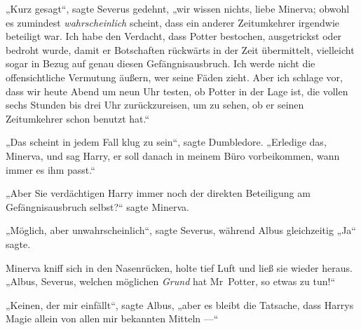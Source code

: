 „Kurz gesagt“, sagte Severus gedehnt, „wir wissen nichts, liebe Minerva; obwohl es zumindest \emph{wahrscheinlich} scheint, dass ein anderer Zeitumkehrer irgendwie beteiligt war. Ich habe den Verdacht, dass Potter bestochen, ausgetrickst oder bedroht wurde, damit er Botschaften rückwärts in der Zeit übermittelt, vielleicht sogar in Bezug auf genau diesen Gefängnisausbruch. Ich werde nicht die offensichtliche Vermutung äußern, wer seine Fäden zieht. Aber ich schlage vor, dass wir heute Abend um neun Uhr testen, ob Potter in der Lage ist, die vollen sechs Stunden bis drei Uhr zurückzureisen, um zu sehen, ob er seinen Zeitumkehrer schon benutzt hat.“

„Das scheint in jedem Fall klug zu sein“, sagte Dumbledore.
„Erledige das, Minerva, und sag Harry, er soll danach in meinem Büro vorbeikommen, wann immer es ihm passt.“

„Aber Sie verdächtigen Harry immer noch der direkten Beteiligung am Gefängnisausbruch selbst?“ sagte Minerva.

„Möglich, aber unwahrscheinlich“, sagte Severus, während Albus gleichzeitig
„Ja“ sagte.

Minerva kniff sich in den Nasenrücken, holte tief Luft und ließ sie wieder heraus.
„Albus, Severus, welchen möglichen \emph{Grund} hat Mr~Potter, so etwas zu tun!“

„Keinen, der mir einfällt“, sagte Albus, „aber es bleibt die Tatsache, dass Harrys Magie allein von allen mir bekannten Mitteln —“

